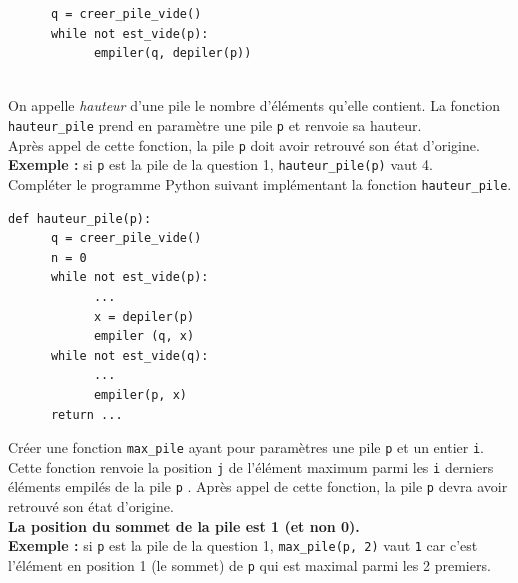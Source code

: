 \documentclass[a4paper,12pt,eval,firamath]{nsi}
\begin{document}
\begin{pyc}
      \begin{verbatim}
      q = creer_pile_vide()
      while not est_vide(p):
            empiler(q, depiler(p))                  
      \end{verbatim}
\end{pyc}

\\


On appelle \textit{hauteur} d'une pile le nombre d'éléments qu'elle contient. La fonction \texttt{hauteur_pile} prend en paramètre une pile \texttt{p} et renvoie sa hauteur.\\
Après appel de cette fonction, la pile \texttt{p} doit avoir retrouvé son état d'origine.\\
\textbf{Exemple : } si \texttt{p} est la pile de la question 1, \texttt{hauteur_pile(p)} vaut 4.\\

\question Compléter le programme Python suivant implémentant la fonction \texttt{hauteur_pile}.

\begin{pyc}
      \begin{verbatim}
def hauteur_pile(p):
      q = creer_pile_vide()
      n = 0
      while not est_vide(p):
            ...
            x = depiler(p)
            empiler (q, x)
      while not est_vide(q):
            ...
            empiler(p, x)
      return ...                        
      \end{verbatim}
\end{pyc}

\question  Créer une fonction \texttt{max_pile} ayant pour paramètres une pile \texttt{p}  et un entier \texttt{i}.\\
Cette fonction renvoie la position \texttt{j}  de l'élément maximum parmi les \texttt{i} derniers éléments empilés de la pile \texttt{p} .
Après appel de cette fonction, la pile \texttt{p}  devra avoir retrouvé son état d'origine.\\
\textbf{La position du sommet de la pile est 1 (et non 0).}\\
\textbf{Exemple :} si \texttt{p}  est la pile de la question 1, \texttt{max_pile(p, 2)} vaut \texttt{1}  car c'est l'élément en position 1 (le sommet) de \texttt{p} qui est maximal parmi les 2 premiers.\\
\end{document}
